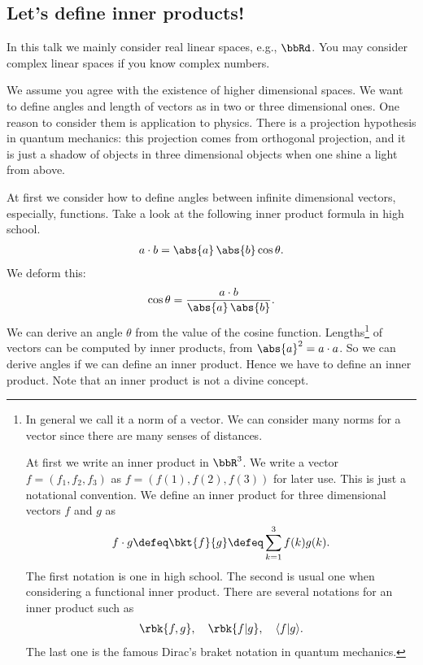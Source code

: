 \documentclass[openany, a4paper, oneside]{jsbook}
\begin{document}
\subsection{Let's define inner products!}

In this talk we mainly consider real linear spaces, e.g., $\bbRd$.
You may consider complex linear spaces if you know complex numbers.

We assume you agree with the existence of higher dimensional spaces.
We want to define angles and length of vectors as in two or three dimensional ones.
One reason to consider them is application to physics.
There is a projection hypothesis in quantum mechanics:
this projection comes from orthogonal projection,
and it is just a shadow of objects in three dimensional objects when
one shine a light from above.

At first we consider how to define angles between infinite dimensional vectors,
especially, functions.
Take a look at the following inner product formula in high school.
\begin{align}
 a \cdot b
 =
 \abs{a} \, \abs{b} \cos \theta.
\end{align}
We deform this:
\begin{align}
 \cos \theta
 =
 \frac{ a \cdot b} {\abs{a} \, \abs{b}}.
\end{align}
We can derive an angle $\theta$ from the value of the cosine function.
Lengths\footnote{In general we call it a norm of a vector.
We can consider many norms for a vector since there are many senses of distances.

At first we write an inner product in $\bbR^3$.
We write a vector $f = (f_1, f_2, f_3)$ as $f = (f(1), f(2), f(3))$ for later use.
This is just a notational convention.
We define an inner product for three dimensional vectors $f$ and $g$ as
\begin{align}
 f \cdot g
 \defeq
 \bkt{f}{g}
 \defeq
 \sum_{k=1}^3 f(k)g(k).
\end{align}
The first notation is one in high school.
The second is usual one when considering a functional inner product.
There are several notations for an inner product such as
\begin{align}
 \rbk{f, g}, \quad \rbk{f | g}, \quad \langle f | g \rangle.
\end{align}
The last one is the famous Dirac's braket notation in quantum mechanics.} of vectors can be computed by inner products,
from $\abs{a}^2 = a \cdot a$.
So we can derive angles if we can define an inner product.
Hence we have to define an inner product.
Note that an inner product is not a divine concept.
\end{document}
